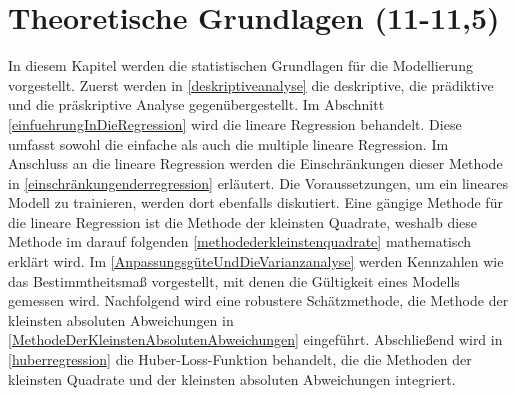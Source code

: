\newpage
\section{Theoretische Grundlagen (11-11,5)}
\label{TheoretischeGrundlagen}
In diesem Kapitel werden die statistischen Grundlagen für die Modellierung vorgestellt. Zuerst werden in \autoref{deskriptiveanalyse} die deskriptive, die prädiktive und die präskriptive Analyse gegenübergestellt. Im Abschnitt \autoref{einfuehrungInDieRegression} wird die lineare Regression behandelt. Diese umfasst sowohl die einfache als auch die multiple lineare Regression. Im Anschluss an die lineare Regression werden die Einschränkungen dieser Methode in \autoref{einschränkungenderregression} erläutert. Die Voraussetzungen, um ein lineares Modell zu trainieren, werden dort ebenfalls diskutiert. Eine gängige Methode für die lineare Regression ist die Methode der kleinsten Quadrate, weshalb diese Methode im darauf folgenden \autoref{methodederkleinstenquadrate} mathematisch erklärt wird. Im \autoref{AnpassungsgüteUndDieVarianzanalyse} werden Kennzahlen wie das Bestimmtheitsmaß vorgestellt, mit denen die Gültigkeit eines Modells gemessen wird.
Nachfolgend wird eine robustere Schätzmethode, die Methode der kleinsten absoluten Abweichungen in \autoref{MethodeDerKleinstenAbsolutenAbweichungen} eingeführt. Abschließend wird in \autoref{huberregression} die Huber-Loss-Funktion behandelt, die die Methoden der kleinsten Quadrate und der kleinsten absoluten Abweichungen integriert.
